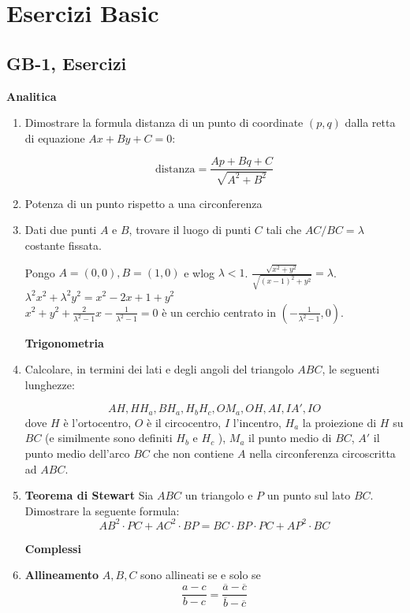 
\section{Esercizi Basic}
\subsection{GB-1, Esercizi}
\textbf{Analitica}
\begin{enumerate}
\item  Dimostrare la formula distanza di un punto di coordinate $(p,q)$ dalla retta di equazione $Ax+By+C=0$:

$$\text{distanza}=\frac{Ap+Bq+C}{\sqrt{A^2+B^2}}$$

\item  Potenza di un punto rispetto a una circonferenza

\item Dati due punti $A$ e $B$, trovare il luogo di punti $C$ tali che $AC/BC=\lambda$ costante fissata.\\
\begin{sol}
 Pongo $A=(0,0),B=(1,0)$ e wlog $\lambda < 1$. $\frac{\sqrt{x^2+y^2}}{\sqrt{(x-1)^2+y^2}}=\lambda$.\\
 $\lambda^2 x^2 + \lambda^2 y^2 =x^2-2x+1+y^2$\\
 $ x^2+y^2+\frac{2}{\lambda^2-1}x - \frac{1}{\lambda^2-1}=0$
 è un cerchio centrato in $(-\frac{1}{\lambda^2-1},0)$.
\end{sol}


\textbf{Trigonometria}

\item  Calcolare, in termini dei lati e degli angoli del triangolo $ABC$, le seguenti lunghezze: 

$$AH, HH_a , BH_a , H_bH_c , OM_a , OH, AI, IA' , IO$$
dove $H$ è l’ortocentro, $O$ è il circocentro, $I$ l’incentro, $H_a$ la proiezione di $H$ su $BC$ (e similmente
sono definiti $H_b$ e $H_c$ ), $M_a$ il punto medio di $BC$, $A'$ il punto medio dell’arco $BC$ che non contiene
$A$ nella circonferenza circoscritta ad $ABC$.

\item \textbf{Teorema di Stewart} Sia $ABC$ un triangolo e $P$ un punto sul lato $BC$. Dimostrare la seguente formula: 
$$AB^2\cdot PC + AC^2 \cdot BP = BC \cdot BP \cdot PC + AP^2 \cdot BC$$


\textbf{Complessi}

\item \textbf{Allineamento} $A,B,C$ sono allineati se e solo se 
$$\frac{a-c}{b-c}=\frac{\overline{a}-\overline{c}}{\overline{b}-\overline{c}}$$


\end{enumerate}
